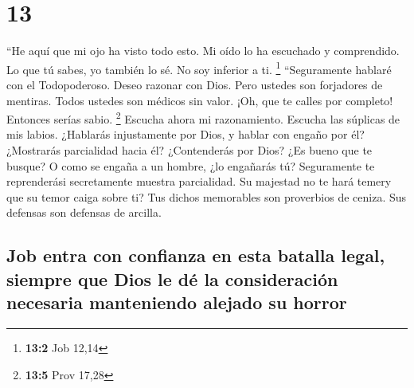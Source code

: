 \hypertarget{section-12}{%
\section{13}\label{section-12}}

 ``He aquí que mi ojo ha visto todo esto. Mi oído lo ha
escuchado y comprendido.  Lo que tú sabes, yo también lo
sé. No soy inferior a ti. \footnote{\textbf{13:2} Job 12,14}
 ``Seguramente hablaré con el Todopoderoso. Deseo razonar
con Dios.  Pero ustedes son forjadores de mentiras. Todos
ustedes son médicos sin valor.  ¡Oh, que te calles por
completo! Entonces serías sabio. \footnote{\textbf{13:5} Prov 17,28}
 Escucha ahora mi razonamiento. Escucha las súplicas de
mis labios.  ¿Hablarás injustamente por Dios, y hablar con
engaño por él?  ¿Mostrarás parcialidad hacia él?
¿Contenderás por Dios?  ¿Es bueno que te busque? O como se
engaña a un hombre, ¿lo engañarás tú?  Seguramente te
reprenderási secretamente muestra parcialidad.  Su
majestad no te hará temery que su temor caiga sobre ti? 
Tus dichos memorables son proverbios de ceniza. Sus defensas son
defensas de arcilla.

\hypertarget{job-entra-con-confianza-en-esta-batalla-legal-siempre-que-dios-le-duxe9-la-consideraciuxf3n-necesaria-manteniendo-alejado-su-horror}{%
\subsection{Job entra con confianza en esta batalla legal, siempre que
Dios le dé la consideración necesaria manteniendo alejado su
horror}\label{job-entra-con-confianza-en-esta-batalla-legal-siempre-que-dios-le-duxe9-la-consideraciuxf3n-necesaria-manteniendo-alejado-su-horror}}

